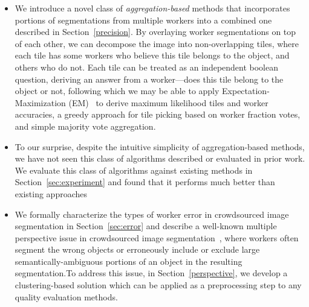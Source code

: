 \begin{itemize}
	\item We introduce a novel class of {\em aggregation-based} methods that incorporates portions of segmentations from multiple workers into a combined one described in Section~\ref{precision}. By overlaying worker segmentations on top of each other, we can decompose the image into non-overlapping tiles, where each tile has some workers who believe this tile belongs to the object, and others who do not. Each tile can be treated as an independent boolean question, deriving an answer from a worker---does this tile belong to the object or not, following which we may be able to apply Expectation-Maximization (EM)~\cite{Dawid1979} to derive maximum likelihood tiles and worker accuracies, a greedy approach for tile picking based on worker fraction votes, and simple majority vote aggregation. 
	\item To our surprise, despite the intuitive simplicity of aggregation-based methods, we have not seen this class of algorithms described or evaluated in prior work. We evaluate this class of algorithms against existing methods in Section~\ref{sec:experiment} and found that it performs much better than existing approaches
	\item We formally characterize the types of worker error in crowdsourced image segmentation in Section~\ref{sec:error} and describe a well-known multiple perspective issue in crowdsourced image segmentation~\cite{Sorokin2008,Lin2014,Guari2018}, where workers often segment the wrong objects or erroneously include or exclude large semantically-ambiguous portions of an object in the resulting segmentation.To address this issue, in Section~\ref{perspective}, we develop a clustering-based solution which can be applied as a preprocessing step to any quality evaluation methods.
\end{itemize}
